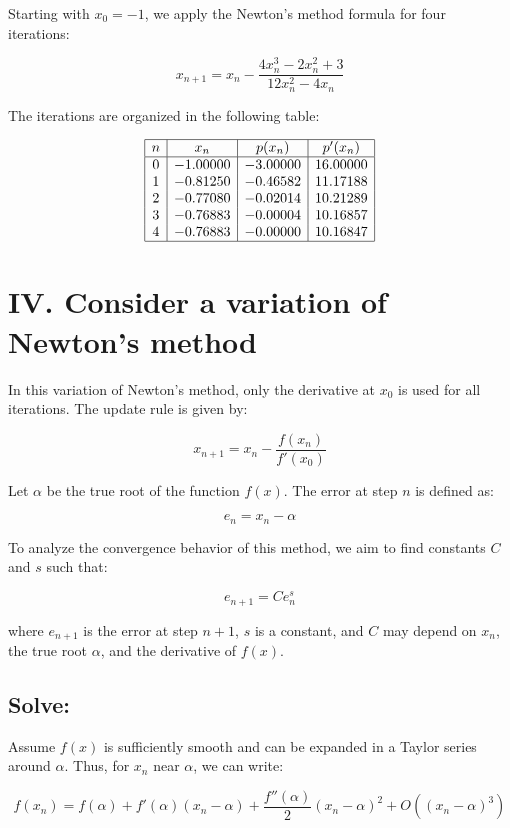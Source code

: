 \documentclass[a4paper]{article}
\begin{document}
Starting with \( x_0 = -1 \), we apply the Newton's method formula for four iterations:

\[
x_{n+1} = x_n - \frac{4x_n^3 - 2x_n^2 + 3}{12x_n^2 - 4x_n}
\]

The iterations are organized in the following table:

\[
\begin{array}{|c|c|c|c|}
\hline
n & x_n & p(x_n) & p'(x_n) \\
\hline
0&-1.00000&-3.00000&16.00000\\
1&-0.81250&-0.46582&11.17188\\
2&-0.77080&-0.02014&10.21289\\
3&-0.76883&-0.00004&10.16857\\
4&-0.76883&-0.00000&10.16847\\
\hline
\end{array}
\]

\section*{IV. Consider a variation of Newton’s method}

In this variation of Newton’s method, only the derivative at \( x_0 \) is used for all iterations. The update rule is given by:

\[
x_{n+1} = x_n - \frac{f(x_n)}{f'(x_0)}
\]

Let \( \alpha \) be the true root of the function \( f(x) \). The error at step \( n \) is defined as:

\[
e_n = x_n - \alpha
\]

To analyze the convergence behavior of this method, we aim to find constants \( C \) and \( s \) such that:

\[
e_{n+1} = C e_n^s
\]

where \( e_{n+1} \) is the error at step \( n+1 \), \( s \) is a constant, and \( C \) may depend on \( x_n \), the true root \( \alpha \), and the derivative of \( f(x) \).

\subsection*{Solve:}
Assume \( f(x) \) is sufficiently smooth and can be expanded in a Taylor series around \( \alpha \). Thus, for \( x_n \) near \( \alpha \), we can write:

\[
f(x_n) = f(\alpha) + f'(\alpha)(x_n - \alpha) + \frac{f''(\alpha)}{2}(x_n - \alpha)^2 + O((x_n - \alpha)^3)
\]
\end{document}
